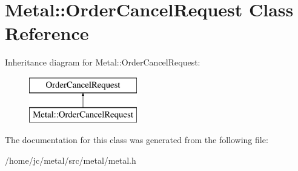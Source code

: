 \hypertarget{classMetal_1_1OrderCancelRequest}{}\section{Metal\+:\+:Order\+Cancel\+Request Class Reference}
\label{classMetal_1_1OrderCancelRequest}
Inheritance diagram for Metal\+:\+:Order\+Cancel\+Request\+:\begin{figure}[H]
\begin{center}
\leavevmode
\includegraphics[height=2.000000cm]{classMetal_1_1OrderCancelRequest}
\end{center}
\end{figure}


The documentation for this class was generated from the following file\+:\begin{DoxyCompactItemize}
\item 
/home/jc/metal/src/metal/metal.\+h\end{DoxyCompactItemize}
